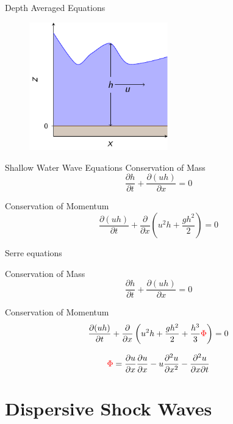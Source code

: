 \documentclass[pdf]{beamer}
\begin{document}


\begin{frame}{Depth Averaged Equations}
	\begin{figure}
		\includegraphics[width=6cm]{./Pictures/Drawn/DepthAveraged.pdf}
	\end{figure}
\end{frame}

\begin{frame}{Shallow Water Wave Equations}
	Conservation of Mass
	\[
	\dfrac{\partial h}{\partial t} + \dfrac{\partial (uh)}{\partial x} = 0
	\]
	
	Conservation of Momentum
	\begin{equation*}
	\dfrac{\partial (uh)}{\partial t} + \dfrac{\partial}{\partial x} \left ( u^2h + \dfrac{gh^2}{2}   \right )  = 0
	\end{equation*}
\end{frame}


\begin{frame}{Serre equations}
	
	Conservation of Mass
	\[
	\dfrac{\partial h}{\partial t} + \dfrac{\partial (uh)}{\partial x} = 0
	\]
	
	Conservation of Momentum
	\begin{equation*}
	 \dfrac{\partial (uh)}{\partial t} + \dfrac{\partial}{\partial x} \left ( u^2h + \dfrac{gh^2}{2} + \dfrac{h^3}{3}{\color{red} \Phi }   \right )  = 0
	\end{equation*}
	
	\[ 	{\color{red} \Phi }  = \dfrac{\partial u }{\partial x} \dfrac{\partial u}{\partial x} -u \dfrac{\partial^2 u}{\partial x^2}  - \dfrac{\partial^2 u}{\partial x \partial t}  \]
\end{frame}



\section{Dispersive Shock Waves}
\end{document}
